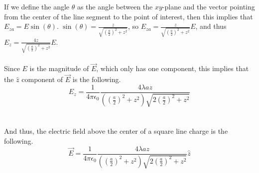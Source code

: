 \documentclass[12pt]{article}
\newcommand{\ds}{\displaystyle}
\begin{document}
\begin{flushleft}
If we define the angle $\theta$ as the angle between the $xy$-plane and the vector pointing from the center of the line segment to the point of interest, then this implies that $E_{za}=E\sin(\theta)$.
$\ds\sin(\theta)=\frac{z}{\sqrt{(\frac{a}{2})^2+z^2}}$, so $\ds E_{za}=\frac{z}{\sqrt{(\frac{a}{2})^2+z^2}}E$, and thus $\ds E_z=\frac{4z}{\sqrt{(\frac{a}{2})^2+z^2}}E$.\\~\\

Since $E$ is the magnitude of $\vec{E}$, which only has one component, this implies that the $\hat{z}$ component of $\vec{E}$ is the following.
$$E_z=\frac{1}{4\pi\epsilon_0}\frac{4\lambda az}{\left((\frac{a}{2})^2+z^2\right)\sqrt{2(\frac{a}{2})^2+z^2}}$$\\~\\

And thus, the electric field above the center of a square line charge is the following.
$$\vec{E}=\frac{1}{4\pi\epsilon_0}\frac{4\lambda az}{\left((\frac{a}{2})^2+z^2\right)\sqrt{2(\frac{a}{2})^2+z^2}}\hat{z}$$



\end{flushleft}
\end{document}
